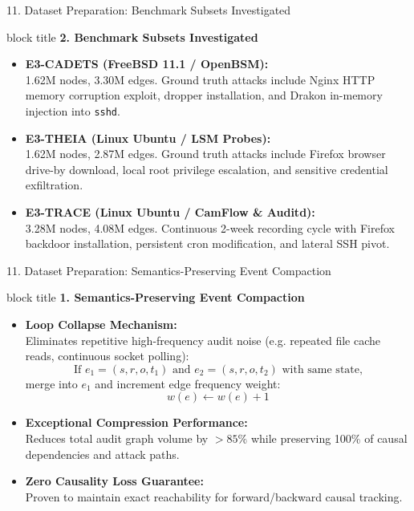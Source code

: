 \documentclass[aspectratio=169,10pt]{beamer}
\begin{document}
\begin{frame}{11. Dataset Preparation: Benchmark Subsets Investigated}
\vspace{0.3em}
\begin{beamercolorbox}[rounded=true,shadow=false,sep=0.45em,wd=\textwidth]{block title}
\textbf{\scriptsize 2. Benchmark Subsets Investigated}
\end{beamercolorbox}
\vspace{0.3em}
{\fontsize{8.0pt}{11.8pt}\selectfont
\begin{itemize}\itemsep0.60em
  \item \textbf{E3-CADETS (FreeBSD 11.1 / OpenBSM):}\\
  1.62M nodes, 3.30M edges. Ground truth attacks include Nginx HTTP memory corruption exploit, dropper installation, and Drakon in-memory injection into \texttt{sshd}.
  \item \textbf{E3-THEIA (Linux Ubuntu / LSM Probes):}\\
  1.62M nodes, 2.87M edges. Ground truth attacks include Firefox browser drive-by download, local root privilege escalation, and sensitive credential exfiltration.
  \item \textbf{E3-TRACE (Linux Ubuntu / CamFlow \& Auditd):}\\
  3.28M nodes, 4.08M edges. Continuous 2-week recording cycle with Firefox backdoor installation, persistent cron modification, and lateral SSH pivot.
\end{itemize}
}
\end{frame}

\begin{frame}{11. Dataset Preparation: Semantics-Preserving Event Compaction}
\vspace{0.3em}
\begin{beamercolorbox}[rounded=true,shadow=false,sep=0.45em,wd=\textwidth]{block title}
\textbf{\scriptsize 1. Semantics-Preserving Event Compaction}
\end{beamercolorbox}
\vspace{0.3em}
{\fontsize{8.0pt}{11.5pt}\selectfont
\begin{itemize}\itemsep0.45em
  \item \textbf{Loop Collapse Mechanism:}\\
  Eliminates repetitive high-frequency audit noise (e.g. repeated file cache reads, continuous socket polling):
  $$\text{If } e_1 = (s, r, o, t_1) \text{ and } e_2 = (s, r, o, t_2) \text{ with same state,}$$
  merge into $e_1$ and increment edge frequency weight:
  $$w(e) \leftarrow w(e) + 1$$
  \item \textbf{Exceptional Compression Performance:}\\
  Reduces total audit graph volume by \textbf{$>85\%$} while preserving 100\% of causal dependencies and attack paths.
  \item \textbf{Zero Causality Loss Guarantee:}\\
  Proven to maintain exact reachability for forward/backward causal tracking.
\end{itemize}
}
\end{frame}
\end{document}
